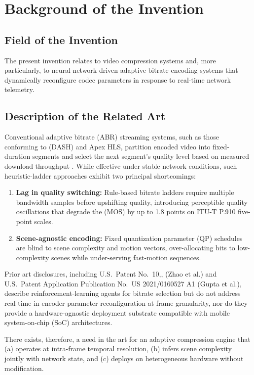 \section{Background of the Invention}\label{sec:background}

\subsection{Field of the Invention}

The present invention relates to video compression systems and, more particularly, to
neural-network-driven adaptive bitrate encoding systems that dynamically reconfigure
codec parameters in response to real-time network telemetry.

\subsection{Description of the Related Art}

Conventional adaptive bitrate (ABR) streaming systems, such as those conforming to
 (DASH) and Apex HLS, partition encoded
video into fixed-duration segments and select the next segment's quality level based on
measured download throughput . While effective under stable network
conditions, such heuristic-ladder approaches exhibit two principal shortcomings:

\begin{enumerate}[label=(\roman*), leftmargin=2em, itemsep=2pt]
  \item \textbf{Lag in quality switching:} Rule-based bitrate ladders require multiple
    bandwidth samples before upshifting quality, introducing perceptible quality
    oscillations that degrade the  (MOS) by up to 1.8 points
    on ITU-T P.910 five-point scales.
  \item \textbf{Scene-agnostic encoding:} Fixed quantization parameter (QP) schedules
    are blind to scene complexity and motion vectors, over-allocating bits to
    low-complexity scenes while under-serving fast-motion sequences.
\end{enumerate}

Prior art disclosures, including U.S.\ Patent No.\ 10,, (Zhao et al.) and
U.S.\ Patent Application Publication No.\ US 2021/0160527 A1 (Gupta et al.), describe
reinforcement-learning agents for bitrate selection but do not address real-time
in-encoder parameter reconfiguration at frame granularity, nor do they provide a
hardware-agnostic deployment substrate compatible with mobile system-on-chip (SoC)
architectures.

There exists, therefore, a need in the art for an adaptive compression engine that (a)
operates at intra-frame temporal resolution, (b) infers scene complexity jointly with
network state, and (c) deploys on heterogeneous hardware without modification.

